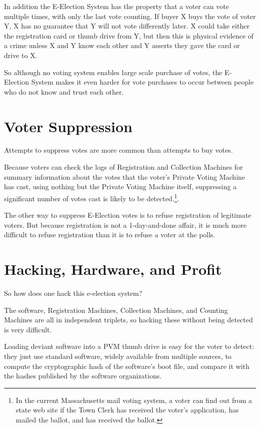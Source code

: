 \documentclass[12pt]{article}
\begin{document}
In addition the E-Election System has the property that a voter
can vote multiple times, with only the last vote counting.
If buyer X buys the vote of voter Y, X has no guarantee that
Y will not vote differently later.  X could take either the
registration card or thumb drive from Y, but then this is
physical evidence of a crime unless X and Y know each other
and Y asserts they gave the card or drive to X.

So although no voting system enables large scale purchase of
votes, the E-Election System makes it even harder for vote purchases
to occur between people who do not know and trust each other.


\section{Voter Suppression}

Attempts to suppress votes are more common than attempts to buy votes.

Because voters can check the logs of Registration and Collection Machines
for summary information about the votes that the voter's Private Voting Machine
has cast, using nothing but the Private Voting Machine itself,
suppressing a significant number of votes cast is likely
to be detected.\footnote{In the current Massachusetts mail voting
system, a voter can find out from a state web site if the Town Clerk
has received the voter's application, has mailed the ballot, and has
received the ballot.}.

The other way to suppress E-Election votes is to refuse registration
of legitimate voters.  But because registration is not a 1-day-and-done
affair, it is much more difficult to refuse registration than it is
to refuse a voter at the polls.

\section{Hacking, Hardware, and Profit}

So how does one hack this e-election system?

The software, Registration Machines, Collection Machines,
and Counting Machines are all in independent triplets, so
hacking these without being detected is very difficult.

Loading deviant software into a PVM thumb drive is easy
for the voter to detect: they just use standard software,
widely available from multiple sources, to compute
the cryptographic hash of the software's boot file, and
compare it with the hashes published by the software
organizations.
\end{document}
